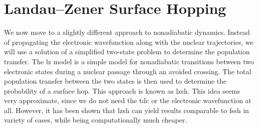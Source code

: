 \section{Landau--Zener Surface Hopping}\label{sec:landau_zener}
We now move to a slightly different approach to nonadiabatic dynamics. Instead of propagating the electronic wavefunction along with the nuclear trajectories, we will use a solution of a simplified two-state problem to determine the population transfer. The \gls{lz} model is a simple model for nonadiabatic transitions between two electronic states during a nuclear passage through an avoided crossing. The total population transfer between the two states is then used to determine the probability of a surface hop. This approach is known as \gls{lzsh}. This idea seems very approximate, since we do not need the \gls{tdc} or the electronic wavefunction at all. However, it has been shown that \gls{lzsh} can yield results comparable to \gls{fssh} in variety of cases, while being computationally much cheaper. \supercite{10.1021/acs.jctc.0c00512}

